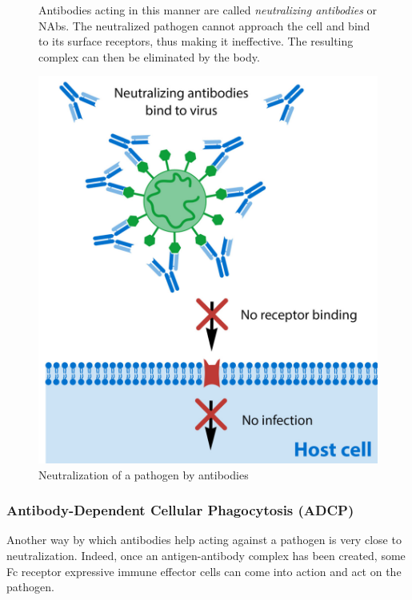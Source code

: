 \begin{figure}[H]
\begin{minipage}{0.55\textwidth}
        Antibodies acting in this manner are called \emph{neutralizing antibodies}
        or NAbs. The neutralized pathogen cannot approach the cell and
        bind to its surface receptors, thus making it ineffective. 
        The resulting complex can then be eliminated by the body.
    \end{minipage}\hfill
    \begin{minipage}{0.35\textwidth}
        \centering
        \includegraphics[width=\textwidth]{../Images/neutralization.png}   
        \caption{Neutralization of a pathogen by antibodies}
        \label{fig:neutralization}
    \end{minipage}
\end{figure}

\newpage

\subsubsection{Antibody-Dependent Cellular Phagocytosis (ADCP)}

Another way by which antibodies help acting against a pathogen is very
close to neutralization. Indeed, once an antigen-antibody complex has been
created, some Fc receptor expressive immune effector cells can come into action
and act on the pathogen. 

